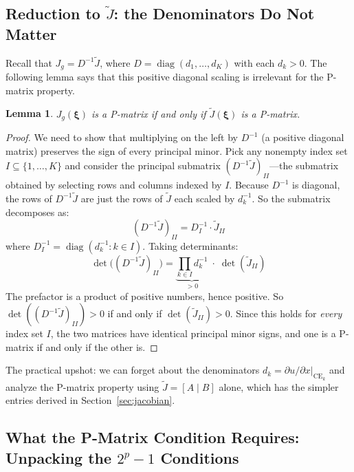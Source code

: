 \documentclass[11pt,a4paper]{article}
\newtheorem{lemma}[theorem]{Lemma}
\theoremstyle{definition}
\newcommand{\bxi}{\boldsymbol{\xi}}
\DeclareMathOperator{\CE}{CE}
\DeclareMathOperator{\diag}{diag}
\begin{document}
\subsection{Reduction to $\widetilde{J}$: the Denominators Do Not Matter}

Recall that $J_g = D^{-1} \widetilde{J}$, where $D = \diag(d_1, \ldots, d_K)$
with each $d_k > 0$. The following lemma says that this positive diagonal
scaling is irrelevant for the P-matrix property.

\begin{lemma}
\label{lem:D_reduction}
$J_g(\bxi)$ is a P-matrix if and only if $\widetilde{J}(\bxi)$ is a P-matrix.
\end{lemma}

\begin{proof}
We need to show that multiplying on the left by $D^{-1}$ (a positive diagonal
matrix) preserves the sign of every principal minor. Pick any nonempty index
set $I \subseteq \{1, \ldots, K\}$ and consider the principal submatrix
$(D^{-1}\widetilde{J})_{II}$---the submatrix obtained by selecting rows and
columns indexed by $I$. Because $D^{-1}$ is diagonal, the rows of
$D^{-1}\widetilde{J}$ are just the rows of $\widetilde{J}$ each scaled by
$d_k^{-1}$. So the submatrix decomposes as:
\begin{equation}
    (D^{-1}\widetilde{J})_{II} = D_I^{-1} \cdot \widetilde{J}_{II}
\end{equation}
where $D_I^{-1} = \diag(d_k^{-1} : k \in I)$. Taking determinants:
\begin{equation}
    \det\!\big((D^{-1}\widetilde{J})_{II}\big)
    = \underbrace{\prod_{k \in I} d_k^{-1}}_{> 0}
    \;\cdot\; \det(\widetilde{J}_{II})
\end{equation}
The prefactor is a product of positive numbers, hence positive. So
$\det((D^{-1}\widetilde{J})_{II}) > 0$ if and only if
$\det(\widetilde{J}_{II}) > 0$. Since this holds for \emph{every} index set
$I$, the two matrices have identical principal minor signs, and one is a
P-matrix if and only if the other is.
\end{proof}

The practical upshot: we can forget about the denominators
$d_k = \partial u / \partial x |_{\CE_k}$ and analyze the P-matrix property
using $\widetilde{J} = [A \mid B]$ alone, which has the simpler entries
derived in Section~\ref{sec:jacobian}.

\subsection{What the P-Matrix Condition Requires: Unpacking the $2^p - 1$
Conditions}
\end{document}

